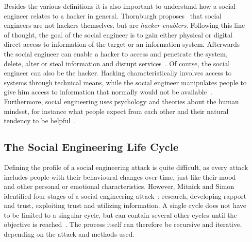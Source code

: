 Besides the various definitions it is also important to understand how a
social engineer relates to a hacker in general. Thornburgh
proposes~\cite{thornburgh2004} that social engineers are not hackers
themselves, but are \textit{hacker-enablers}. Following this line of thought,
the goal of the social engineer is to gain either physical or digital direct
access to information of the target or an information system. Afterwards the
social engineer can enable a hacker to access and penetrate the system, delete,
alter or steal information and disrupt services~\cite{thornburgh2004}. Of
course, the social engineer can also be the hacker. Hacking characteristically
involves access to systems through technical means, while the social engineer
manipulates people to give him access to information that normally would not
be available~\cite{jones2004}. Furthermore, social engineering uses psychology
and theories about the human mindset, for instance what people expect from each
other and their natural tendency to be helpful~\cite{jones2004}.


\subsection{The Social Engineering Life Cycle}

Defining the profile of a social engineering attack is quite difficult, as
every attack includes people with their behavioural changes over time, just
like their mood and other personal or emotional characteristics. However,
Mitnick and Simon identified four stages of a social engineering
attack~\cite{mitnick2003}: research, developing rapport and trust, exploiting
trust and utilizing information. A single cycle does not have to be limited to
a singular cycle, but can contain several other cycles until the objective is
reached~\cite{thornburgh2004}. The process itself can therefore be recursive
and iterative, depending on the attack and methods used.

